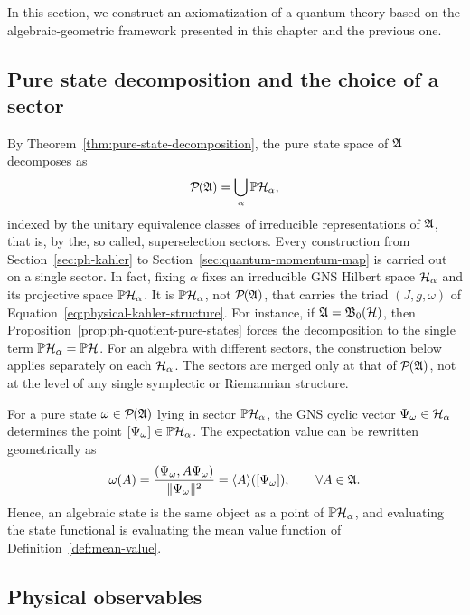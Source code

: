 \noindent In this section, we construct an axiomatization of a quantum theory based on the algebraic-geometric framework presented in this chapter and the previous one.


\subsection*{Pure state decomposition and the choice of a sector}

By Theorem~\ref{thm:pure-state-decomposition}, the pure state space of $\mathfrak{A}$ decomposes as
\[
\mathcal P(\A) = \bigcup_\alpha \PH_\alpha,
\]
indexed by the unitary equivalence classes of irreducible representations of $\mathfrak{A}$, that is, by the, so called, superselection sectors. Every construction from Section~\ref{sec:ph-kahler} to Section~\ref{sec:quantum-momentum-map} is carried out on a single sector. In fact, fixing $\alpha$ fixes an irreducible GNS Hilbert space $\H_\alpha$ and its projective space $\PH_\alpha$. It is $\PH_\alpha$, not $\mathcal P(\A)$, that carries the triad $(J,g,\omega)$ of Equation~\eqref{eq:physical-kahler-structure}. For instance, if $\A=\mathfrak B_0(\H)$, then Proposition~\ref{prop:ph-quotient-pure-states} forces the decomposition to the single term $\PH_\alpha=\PH$. For an algebra with different sectors, the construction below applies separately on each $\H_\alpha$. The sectors are merged only at that of $\mathcal P(\A)$, not at the level of any single symplectic or Riemannian structure.

\begin{remark}
	\label{rem:algebraic-geometric-states}
	For a pure state $\omega \in \mathcal{P}(\A)$ lying in sector $\PH_\alpha$, the GNS cyclic vector $\Psi_\omega \in \H_\alpha$ determines the point $[\Psi_\omega]\in\PH_\alpha$. The expectation value can be rewritten geometrically as
	\begin{equation}
		\omega(A) = \frac{(\Psi_\omega, A \Psi_\omega)}{\|\Psi_\omega\|^2} = \langle A \rangle([\Psi_\omega]), \qquad \forall A \in \mathfrak{A}.
	\end{equation}
	Hence, an algebraic state is the same object as a point of $\PH_\alpha$, and evaluating the state functional is evaluating the mean value function of Definition~\ref{def:mean-value}.
\end{remark}

\subsection*{Physical observables}

